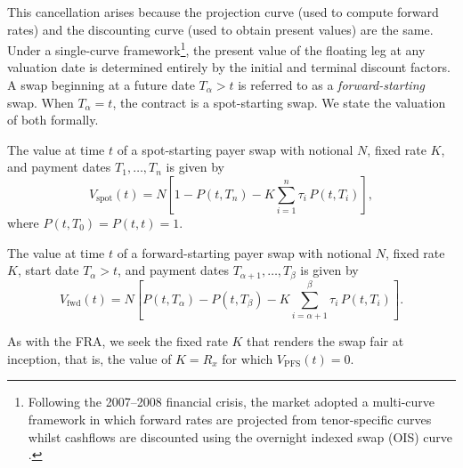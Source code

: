         \noindent
        This cancellation arises because the projection curve (used to compute forward rates) and the discounting curve (used to obtain present values) are the same. Under a single-curve framework\footnote{Following the 2007--2008 financial crisis, the market adopted a multi-curve framework in which forward rates are projected from tenor-specific curves whilst cashflows are discounted using the overnight indexed swap (OIS) curve \cite{HenrardMulticurve2014}.}, the present value of the floating leg at any valuation date is determined entirely by the initial and terminal discount factors. \\ 
          
        \noindent
        A swap beginning at a future date $T_{\alpha} > t$ is referred to as a \textit{forward-starting} swap. When $T_{\alpha} = t$, the contract is a spot-starting swap. We state the valuation of both formally.
        
        \begin{proposition} \label{prop:spot_swap}
        The value at time $t$ of a spot-starting payer swap with notional $N$, fixed rate $K$, and payment dates $T_1, \ldots, T_n$ is given by
        \begin{equation} \label{eq:spot_swap_value}
          V_{\text{spot}}(t) = N \left[ 1 - P(t, T_n) - K \sum_{i=1}^{n} \tau_i \, P(t, T_i) \right],
        \end{equation}
        where $P(t, T_0) = P(t, t) = 1$.
        \end{proposition}
        
        \begin{proposition} \label{prop:fwd_swap}
        The value at time $t$ of a forward-starting payer swap with notional $N$, fixed rate $K$, start date $T_{\alpha} > t$, and payment dates $T_{\alpha+1}, \ldots, T_{\beta}$ is given by
        \begin{equation} \label{eq:fwd_swap_value}
          V_{\text{fwd}}(t) = N \left[ P(t, T_{\alpha}) - P(t, T_{\beta}) - K \sum_{i=\alpha+1}^{\beta} \tau_i \, P(t, T_i) \right].
        \end{equation}
        \end{proposition}

        \noindent
        As with the FRA, we seek the fixed rate $K$ that renders the swap fair at inception, that is, the value of $K =R_x$ for which $V_{\text{PFS}}(t) = 0$.  \\

